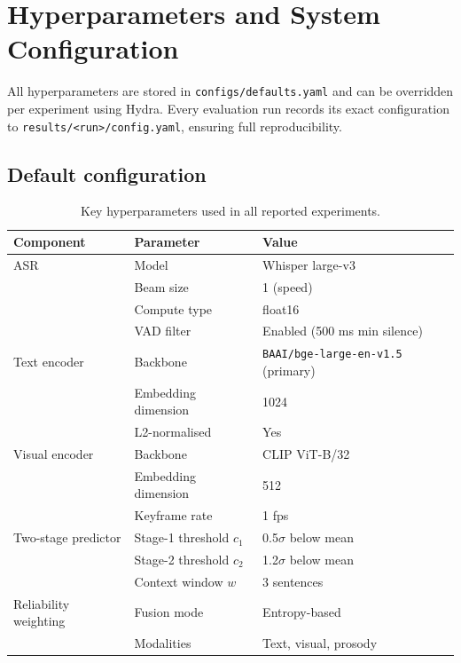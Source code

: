\chapter{Hyperparameters and System Configuration}
\label{app:hparams}

All hyperparameters are stored in \texttt{configs/defaults.yaml} and can be
overridden per experiment using Hydra.
Every evaluation run records its exact configuration to \texttt{results/<run>/config.yaml},
ensuring full reproducibility.

\section{Default configuration}

\begin{table}[h]
  \centering
  \caption{Key hyperparameters used in all reported experiments.}
  \label{tab:hparams}
  \small
  \begin{tabular}{lll}
    \toprule
    Component & Parameter & Value \\
    \midrule
    ASR & Model & Whisper large-v3 \\
        & Beam size & 1 (speed) \\
        & Compute type & float16 \\
        & VAD filter & Enabled (500 ms min silence) \\
    \midrule
    Text encoder & Backbone & \texttt{BAAI/bge-large-en-v1.5} (primary) \\
                 & Embedding dimension & 1024 \\
                 & L2-normalised & Yes \\
    \midrule
    Visual encoder & Backbone & CLIP ViT-B/32 \\
                   & Embedding dimension & 512 \\
                   & Keyframe rate & 1 fps \\
    \midrule
    Two-stage predictor & Stage-1 threshold $c_1$ & 0.5$\sigma$ below mean \\
                        & Stage-2 threshold $c_2$ & 1.2$\sigma$ below mean \\
                        & Context window $w$ & 3 sentences \\
    \midrule
    Reliability weighting & Fusion mode & Entropy-based \\
                          & Modalities & Text, visual, prosody \\
    \midrule

\end{tabular}
\end{table}

